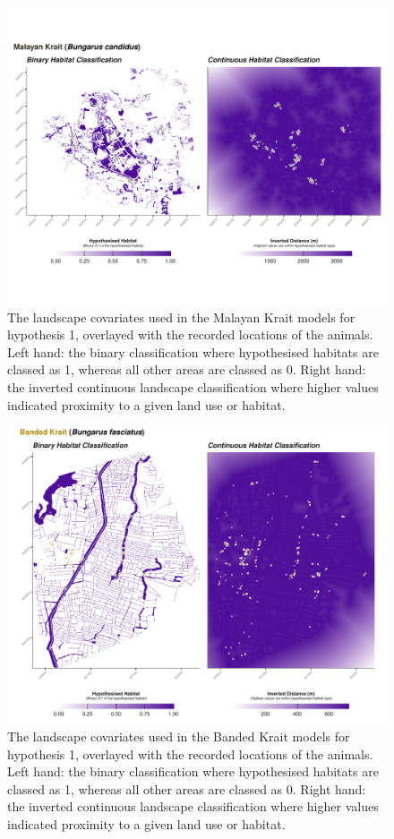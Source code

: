 \documentclass[10pt,a4paper]{article}
\begin{document}
\begin{figure}[h]
\includegraphics[width=1\linewidth]{../../figures/landscape_plot_BUCA_H1} \caption{The landscape covariates used in the Malayan Krait models for hypothesis 1, overlayed with the recorded locations of the animals. Left hand: the binary classification where hypothesised habitats are classed as 1, whereas all other areas are classed as 0. Right hand: the inverted continuous landscape classification where higher values indicated proximity to a given land use or habitat.}\label{fig:landscapePlotBUCA1}
\end{figure}

\begin{figure}[h]
\includegraphics[width=1\linewidth]{../../figures/landscape_plot_BUFA_H1} \caption{The landscape covariates used in the Banded Krait models for hypothesis 1, overlayed with the recorded locations of the animals. Left hand: the binary classification where hypothesised habitats are classed as 1, whereas all other areas are classed as 0. Right hand: the inverted continuous landscape classification where higher values indicated proximity to a given land use or habitat.}\label{fig:landscapePlotBUFA1}
\end{figure}
\end{document}

